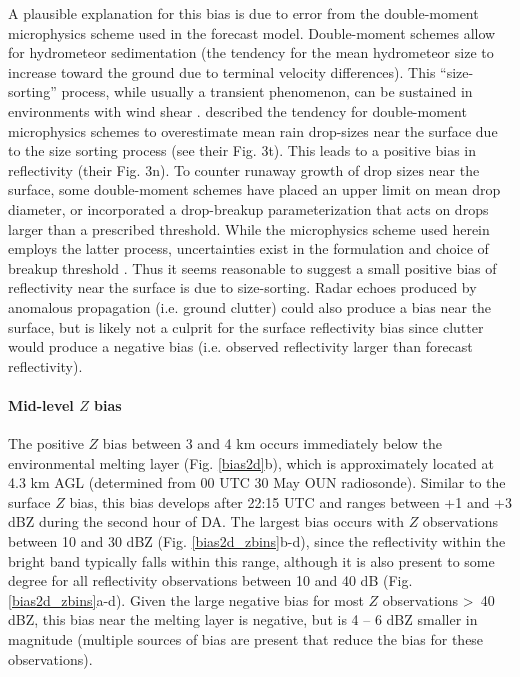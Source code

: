 A plausible explanation for this bias is due to error from the double-moment microphysics scheme used in the forecast model. Double-moment schemes allow for hydrometeor sedimentation (the tendency for the mean hydrometeor size to increase toward the ground due to terminal velocity differences). This “size-sorting” process, while usually a transient phenomenon, can be sustained in environments with wind shear \citep{kumjianryzhkov12}. \citet{milbrandtyau05} described the tendency for double-moment microphysics schemes to overestimate mean rain drop-sizes near the surface due to the size sorting process (see their Fig. 3t). This leads to a positive bias in reflectivity (their Fig. 3n). To counter runaway growth of drop sizes near the surface, some double-moment schemes have placed an upper limit on mean drop diameter, or incorporated a drop-breakup parameterization that acts on drops larger than a prescribed threshold. While the microphysics scheme used herein employs the latter process, uncertainties exist in the formulation and choice of breakup threshold \citep{morrisonetal12}. Thus it seems reasonable to suggest a small positive bias of reflectivity near the surface is due to size-sorting. Radar echoes produced by anomalous propagation (i.e. ground clutter) could also produce a bias near the surface, but is likely not a culprit for the surface reflectivity bias since clutter would produce a negative bias (i.e. observed reflectivity larger than forecast reflectivity).

\paragraph{Mid-level \(Z\) bias}
The positive \(Z\) bias between 3 and 4 km occurs immediately below the environmental melting layer (Fig. \ref{bias2d}b), which is approximately located at 4.3 km AGL (determined from 00 UTC 30 May OUN radiosonde). Similar to the surface \(Z\) bias, this bias develops after 22:15 UTC and ranges between +1 and +3 dBZ during the second hour of DA. The largest bias occurs with \(Z\) observations between 10 and 30 dBZ (Fig. \ref{bias2d_zbins}b-d), since the reflectivity within the bright band typically falls within this range, although it is also present to some degree for all reflectivity observations between 10 and 40 dB (Fig. \ref{bias2d_zbins}a-d). Given the large negative bias for most \(Z\) observations \textgreater\, 40 dBZ, this bias near the melting layer is negative, but is 4 -- 6 dBZ smaller in magnitude (multiple sources of bias are present that reduce the bias for these observations).


